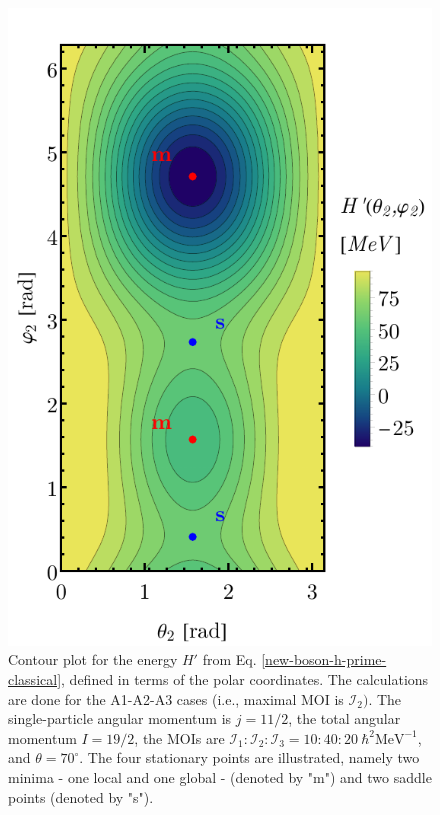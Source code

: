 \begin{figure}
    \begin{center}
        \includegraphics[scale=0.7]{Chapters/Figures/New-Boson-Classical-H-2axis-quantization.pdf}
        \caption{Contour plot for the energy $H'$ from Eq. \ref{new-boson-h-prime-classical}, defined in terms of the polar coordinates. The calculations are done for the A1-A2-A3 cases (i.e., maximal MOI is $\mathcal{I}_2)$. The single-particle angular momentum is $j=11/2$, the total angular momentum $I=19/2$, the MOIs are $\mathcal{I}_1:\mathcal{I}_2:\mathcal{I}_3=10:40:20\ \hbar^2\text{MeV}^{-1}$, and $\theta=70^\circ$. The four stationary points are illustrated, namely two minima - one local and one global - (denoted by "m") and two saddle points (denoted by "s").}
        \label{new-boson-hprime-2axis-contour-plot}
    \end{center}
\end{figure}
